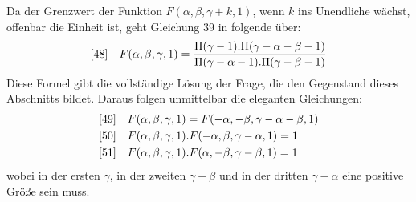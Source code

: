 Da der Grenzwert der Funktion $F(\alpha,\beta,\gamma+k,1)$, wenn $k$ ins Unendliche wächst, offenbar die Einheit ist, geht Gleichung 39 in folgende über:
\[
\begin{array}{@{}ll@{}}
[48]&\displaystyle F(\alpha,\beta,\gamma,1)=
\frac{\Pi(\gamma-1).\Pi(\gamma-\alpha-\beta-1)}
{\Pi(\gamma-\alpha-1).\Pi(\gamma-\beta-1)}
\end{array}
\]
Diese Formel gibt die vollständige Lösung der Frage, die den Gegenstand dieses Abschnitts bildet. Daraus folgen unmittelbar die eleganten Gleichungen:
\[
\begin{array}{@{}ll@{}}
[49]&\displaystyle F(\alpha,\beta,\gamma,1)=F(-\alpha,-\beta,\gamma-\alpha-\beta,1)\\[3pt]
[50]&\displaystyle F(\alpha,\beta,\gamma,1).F(-\alpha,\beta,\gamma-\alpha,1)=1\\[3pt]
[51]&\displaystyle F(\alpha,\beta,\gamma,1).F(\alpha,-\beta,\gamma-\beta,1)=1
\end{array}
\]
wobei in der ersten $\gamma$, in der zweiten $\gamma-\beta$ und in der dritten $\gamma-\alpha$ eine positive Größe sein muss.

